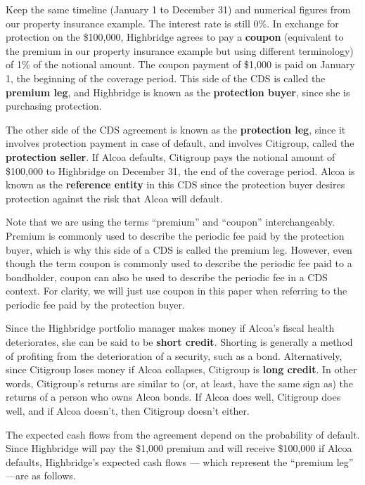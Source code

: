 \documentclass{jss}
\begin{document}
Keep the same timeline (January 1 to December 31) and numerical figures from our property insurance example. The interest rate is still 0\%. In exchange for protection on the \$100,000, Highbridge agrees to pay a \textbf{coupon} (equivalent to the premium in our property insurance example but using different terminology) of 1\% of the notional amount. The coupon payment of \$1,000 is paid on January 1, the beginning of the coverage period. This side of the CDS is called the \textbf{premium leg}, and Highbridge is known as the \textbf{protection buyer}, since she is purchasing protection.

The other side of the CDS agreement is known as the \textbf{protection leg}, since it involves protection payment in case of default, and involves Citigroup, called the \textbf{protection seller}. If Alcoa defaults, Citigroup pays the notional amount of \$100,000 to Highbridge on December 31, the end of the coverage period. Alcoa is known as the \textbf{reference entity} in this CDS since the protection buyer desires protection against the risk that Alcoa will default. 

Note that we are using the terms ``premium'' and ``coupon'' interchangeably. Premium is commonly used to describe the periodic fee paid by the protection buyer, which is why this side of a CDS is called the premium leg. However, even though the term coupon is commonly used to describe the periodic fee paid to a bondholder, coupon can also be used to describe the periodic fee in a CDS context. For clarity, we will just use coupon in this paper when referring to the periodic fee paid by the protection buyer.


Since the Highbridge portfolio manager makes money if Alcoa's fiscal health deteriorates, she can be said to be \textbf{short credit}. Shorting is generally a method of profiting from the deterioration of a security, such as a bond. Alternatively, since Citigroup loses money if Alcoa collapses, Citigroup is \textbf{long credit}. In other words, Citigroup's returns are similar to (or, at least, have the same sign as) the returns of a person who owns Alcoa bonds. If Alcoa does well, Citigroup does well, and if Alcoa doesn't, then Citigroup doesn't either.

The expected cash flows from the agreement depend on the probability of default. Since Highbridge will pay the \$1,000 premium and will receive \$100,000 if Alcoa defaults, Highbridge's expected cash flows --- which represent the ``premium leg'' ---are as follows. 
\end{document}
